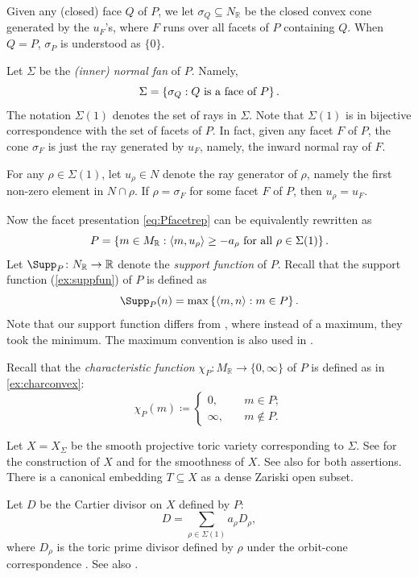 Given any (closed) face $Q$ of $P$, we let $\sigma_Q\subseteq N_{\mathbb{R}}$ be the closed convex cone generated by the $u_F$'s, where $F$ runs over all facets of $P$ containing $Q$. When $Q=P$, $\sigma_P$ is understood as $\{0\}$.

Let $\Sigma$ be the \emph{(inner) normal fan} of $P$. Namely,
\[
\Sigma=\left\{\sigma_Q:Q\textup{ is a face of }P\right\}.
\]
The notation $\Sigma(1)$ denotes the set of rays in $\Sigma$. Note that $\Sigma(1)$ is in bijective correspondence with the set of facets of $P$. In fact, given any facet $F$ of $P$, the cone $\sigma_F$ is just the ray generated by $u_F$, namely, the inward normal ray of $F$.

For any $\rho\in \Sigma(1)$, let $u_{\rho}\in N$ denote the ray generator of $\rho$, namely the first non-zero element in $N\cap \rho$. If $\rho=\sigma_F$ for some facet $F$ of $P$, then $u_{\rho}=u_F$.

Now the facet presentation \eqref{eq:Pfacetrep} can be equivalently rewritten as
\[
P=\left\{m\in M_{\mathbb{R}} : \langle m,u_{\rho} \rangle\geq -a_{\rho}\textup{ for all }\rho\in \Sigma(1) \right\}.
\]
Let $\Supp_P\colon N_{\mathbb{R}} \rightarrow \mathbb{R}$ denote the \emph{support function} of $P$. Recall that the support function (\cref{ex:suppfun}) of $P$ is defined as
\[
\Supp_P(n)=\max\left\{ \langle m,n \rangle: m\in P \right\}.
\]
Note that our support function differs from \cite[Proposition~4.2.14]{CLS11}, where instead of a maximum, they took the minimum. The maximum convention is also used in \cite[Definition~18.2.1]{FPT}.

Recall that the \emph{characteristic function} $\chi_P\colon M_{\mathbb{R}}\rightarrow \{0,\infty\}$ of $P$ is defined as in \cref{ex:charconvex}:
\[
\chi_P(m)\coloneqq
    \begin{cases}
        0,&\quad m\in P;\\
        \infty,&\quad m\not\in P.
    \end{cases}
\]

Let $X=X_{\Sigma}$ be the smooth projective toric variety corresponding to $\Sigma$. See \cite[Theorem~3.1.5]{CLS11} for the construction of $X$ and \cite[Theorem~3.1.19]{CLS11} for the smoothness of $X$. See also \cite[Theorem~18.7.3]{FPT} for both assertions. There is a canonical embedding $T\subseteq X$ as a dense Zariski open subset.

Let $D$ be the Cartier divisor on $X$ defined by $P$:
\[
D=\sum_{\rho\in \Sigma(1)} a_{\rho}D_{\rho},
\]
where $D_{\rho}$ is the toric prime divisor defined by $\rho$ under the orbit-cone correspondence \cite[Theorem~3.2.6]{CLS11}. See also \cite[Proposition~18.8.2]{FPT}.

